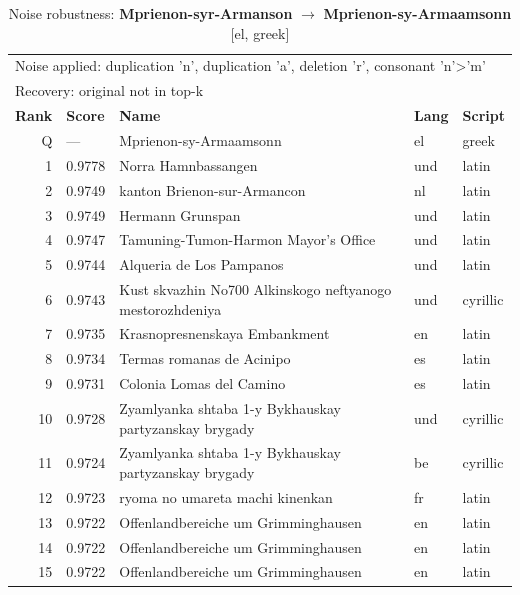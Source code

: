 \begin{table}[htbp]
\centering
\small
\caption{Noise robustness: \textbf{Mprienon-syr-Armanson} $\rightarrow$ \textbf{Mprienon-sy-Armaamsonn} [el, greek]}
\label{tab:noise-27}
\begin{tabular}{rllll}
\toprule
\multicolumn{5}{l}{\small Noise applied: duplication 'n', duplication 'a', deletion 'r', consonant 'n'>'m'} \\
\multicolumn{5}{l}{\small Recovery: original not in top-k} \\
\midrule
\textbf{Rank} & \textbf{Score} & \textbf{Name} & \textbf{Lang} & \textbf{Script} \\
\midrule
\rowcolor{gray!20} Q & --- & Mprienon-sy-Armaamsonn & el & greek \\
\midrule
1 & 0.9778 & Norra Hamnbassangen & und & latin \\
2 & 0.9749 & kanton Brienon-sur-Armancon & nl & latin \\
3 & 0.9749 & Hermann Grunspan & und & latin \\
4 & 0.9747 & Tamuning-Tumon-Harmon Mayor's Office & und & latin \\
5 & 0.9744 & Alqueria de Los Pampanos & und & latin \\
6 & 0.9743 & Kust skvazhin No700 Alkinskogo neftyanogo mestorozhdeniya & und & cyrillic \\
7 & 0.9735 & Krasnopresnenskaya Embankment & en & latin \\
8 & 0.9734 & Termas romanas de Acinipo & es & latin \\
9 & 0.9731 & Colonia Lomas del Camino & es & latin \\
10 & 0.9728 & Zyamlyanka shtaba 1-y Bykhauskay partyzanskay brygady & und & cyrillic \\
11 & 0.9724 & Zyamlyanka shtaba 1-y Bykhauskay partyzanskay brygady & be & cyrillic \\
12 & 0.9723 & ryoma no umareta machi kinenkan & fr & latin \\
13 & 0.9722 & Offenlandbereiche um Grimminghausen & en & latin \\
14 & 0.9722 & Offenlandbereiche um Grimminghausen & en & latin \\
15 & 0.9722 & Offenlandbereiche um Grimminghausen & en & latin \\
\bottomrule
\end{tabular}
\end{table}

